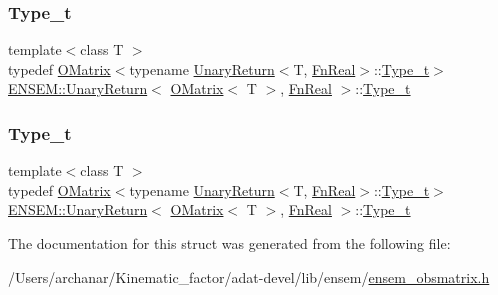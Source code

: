 \subsubsection{\texorpdfstring{Type\_t}{Type\_t}\hspace{0.1cm}{\footnotesize\ttfamily [2/3]}}
{\footnotesize\ttfamily template$<$class T $>$ \\
typedef \mbox{\hyperlink{classENSEM_1_1OMatrix}{O\+Matrix}}$<$typename \mbox{\hyperlink{structENSEM_1_1UnaryReturn}{Unary\+Return}}$<$T, \mbox{\hyperlink{structENSEM_1_1FnReal}{Fn\+Real}}$>$\+::\mbox{\hyperlink{structENSEM_1_1UnaryReturn_3_01OMatrix_3_01T_01_4_00_01FnReal_01_4_a060b381191f238b0c1dc9189a3a14c6d}{Type\+\_\+t}}$>$ \mbox{\hyperlink{structENSEM_1_1UnaryReturn}{E\+N\+S\+E\+M\+::\+Unary\+Return}}$<$ \mbox{\hyperlink{classENSEM_1_1OMatrix}{O\+Matrix}}$<$ T $>$, \mbox{\hyperlink{structENSEM_1_1FnReal}{Fn\+Real}} $>$\+::\mbox{\hyperlink{structENSEM_1_1UnaryReturn_3_01OMatrix_3_01T_01_4_00_01FnReal_01_4_a060b381191f238b0c1dc9189a3a14c6d}{Type\+\_\+t}}}

\mbox{\label{structENSEM_1_1UnaryReturn_3_01OMatrix_3_01T_01_4_00_01FnReal_01_4_a060b381191f238b0c1dc9189a3a14c6d}} 
\subsubsection{\texorpdfstring{Type\_t}{Type\_t}\hspace{0.1cm}{\footnotesize\ttfamily [3/3]}}
{\footnotesize\ttfamily template$<$class T $>$ \\
typedef \mbox{\hyperlink{classENSEM_1_1OMatrix}{O\+Matrix}}$<$typename \mbox{\hyperlink{structENSEM_1_1UnaryReturn}{Unary\+Return}}$<$T, \mbox{\hyperlink{structENSEM_1_1FnReal}{Fn\+Real}}$>$\+::\mbox{\hyperlink{structENSEM_1_1UnaryReturn_3_01OMatrix_3_01T_01_4_00_01FnReal_01_4_a060b381191f238b0c1dc9189a3a14c6d}{Type\+\_\+t}}$>$ \mbox{\hyperlink{structENSEM_1_1UnaryReturn}{E\+N\+S\+E\+M\+::\+Unary\+Return}}$<$ \mbox{\hyperlink{classENSEM_1_1OMatrix}{O\+Matrix}}$<$ T $>$, \mbox{\hyperlink{structENSEM_1_1FnReal}{Fn\+Real}} $>$\+::\mbox{\hyperlink{structENSEM_1_1UnaryReturn_3_01OMatrix_3_01T_01_4_00_01FnReal_01_4_a060b381191f238b0c1dc9189a3a14c6d}{Type\+\_\+t}}}



The documentation for this struct was generated from the following file\+:\begin{DoxyCompactItemize}
\item 
/\+Users/archanar/\+Kinematic\+\_\+factor/adat-\/devel/lib/ensem/\mbox{\hyperlink{adat-devel_2lib_2ensem_2ensem__obsmatrix_8h}{ensem\+\_\+obsmatrix.\+h}}\end{DoxyCompactItemize}
